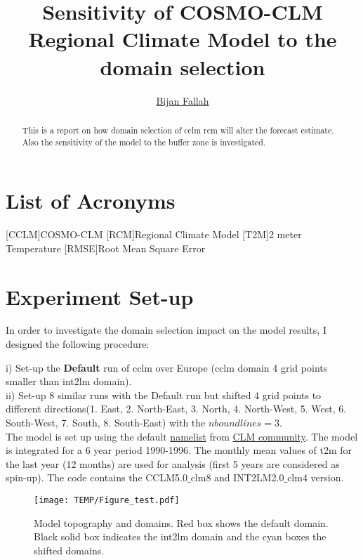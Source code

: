 \documentclass[a4paper,10pt]{report}
\title{Sensitivity of COSMO-CLM Regional Climate Model to the domain selection}
\author{\href{https://www.researchgate.net/profile/Bijan_Fallah}{Bijan Fallah} }
\begin{document}
\maketitle
\section*{List of Acronyms}
\begin{acronym}
[CCLM]{COSMO-CLM}
[RCM]{Regional Climate Model}
[T2M]{2 meter Temperature}
[RMSE]{Root Mean Square Error}
\end{acronym}
\begin{abstract}
This is a report on how domain selection of \ac{cclm} \ac{rcm} will alter the forecast estimate. Also the sensitivity of the model to the buffer zone is investigated.

\end{abstract}

\section{Experiment Set-up}
In order to investigate the domain selection impact on the model results, I designed the following procedure:

i) Set-up the \textbf{Default} run of \ac{cclm} over Europe (\ac{cclm} domain 4 grid points smaller than int2lm domain).\\

ii) Set-up 8 similar runs with the Default run but shifted  4 grid points to different directions(1. East, 2. North-East, 3. North, 4. North-West, 5. West, 6. South-West, 7. South, 8. South-East) with the $nboundlines = 3$.\\ 

The model is set up using the default \href{http://users.met.fu-berlin.de/~BijanFallah/YUSPECIF}{namelist} from \href{http://www.clm-community.eu/namelist-tool/namelist-tool_portal/index.htm?conf=cosmo_all}{CLM community}. The model is integrated for a 6 year period 1990-1996. The monthly mean values of \ac{t2m} for the last year (12 months) are used for analysis (first 5 years are considered as spin-up). The code contains the CCLM5.0$\_$clm8 and INT2LM2.0$\_$clm4 version. 
\begin{figure}%
\texttt{[image: TEMP/Figure\_test.pdf]}
\caption{Model topography and domains. Red box shows the default domain. Black solid box indicates the int2lm domain and the cyan boxes the shifted domains.}
\label{Fig01}
\end{figure} 
\end{document}

